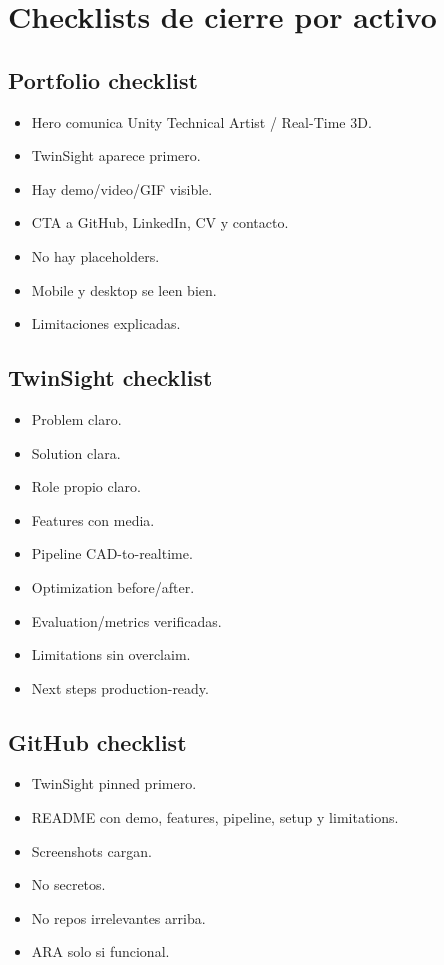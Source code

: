 \chapter{Checklists de cierre por activo}

\section{Portfolio checklist}


\begin{itemize}
\item Hero comunica Unity Technical Artist / Real-Time 3D.
\item TwinSight aparece primero.
\item Hay demo/video/GIF visible.
\item CTA a GitHub, LinkedIn, CV y contacto.
\item No hay placeholders.
\item Mobile y desktop se leen bien.
\item Limitaciones explicadas.
\end{itemize}


\section{TwinSight checklist}


\begin{itemize}
\item Problem claro.
\item Solution clara.
\item Role propio claro.
\item Features con media.
\item Pipeline CAD-to-realtime.
\item Optimization before/after.
\item Evaluation/metrics verificadas.
\item Limitations sin overclaim.
\item Next steps production-ready.
\end{itemize}


\section{GitHub checklist}


\begin{itemize}
\item TwinSight pinned primero.
\item README con demo, features, pipeline, setup y limitations.
\item Screenshots cargan.
\item No secretos.
\item No repos irrelevantes arriba.
\item ARA solo si funcional.
\end{itemize}


